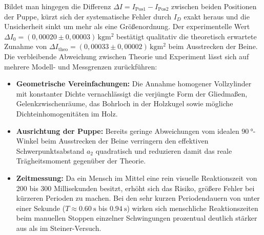 Bildet man hingegen die Differenz $\Delta I = I_{\text{Pos1}} - I_{\text{Pos2}}$ zwischen beiden Positionen der Puppe, kürzt sich der systematische Fehler durch $I_D$ exakt heraus und die Unsicherheit sinkt um mehr als eine Größenordnung. Der experimentelle Wert $\Delta I_0 = (0{,}00020 \pm 0{,}00003)\,\unit{\kilogram\meter\squared}$ bestätigt qualitativ die theoretisch erwartete Zunahme von $\Delta I_{\text{theo}} = (0{,}00033 \pm 0{,}00002)\,\unit{\kilogram\meter\squared}$ beim Ausstrecken der Beine. Die verbleibende Abweichung zwischen Theorie und Experiment lässt sich auf mehrere Modell- und Messgrenzen zurückführen:
\begin{itemize}
	\item \textbf{Geometrische Vereinfachungen:} Die Annahme homogener Vollzylinder mit konstanter Dichte vernachlässigt die verjüngte Form der Gliedmaßen, Gelenkzwischenräume, das Bohrloch in der Holzkugel sowie mögliche Dichteinhomogenitäten im Holz.
	\item \textbf{Ausrichtung der Puppe:} Bereits geringe Abweichungen vom idealen $\qty{90}{\degree}$-Winkel beim Ausstrecken der Beine verringern den effektiven Schwerpunktsabstand $a_2$ quadratisch und reduzieren damit das reale Trägheitsmoment gegenüber der Theorie.
	\item \textbf{Zeitmessung:} Da ein Mensch im Mittel eine rein visuelle Reaktionszeit von 200 bis 300 Millisekunden besitzt, erhöht sich das Risiko, größere Fehler bei kürzeren Perioden zu machen. Bei den sehr kurzen Periodendauern von unter einer Sekunde ($T \approx \qty{0,60}{\second}$ bis $\qty{0,94}{\second}$) wirken sich menschliche Reaktionszeiten beim manuellen Stoppen einzelner Schwingungen prozentual deutlich stärker aus als im Steiner-Versuch.
\end{itemize}
